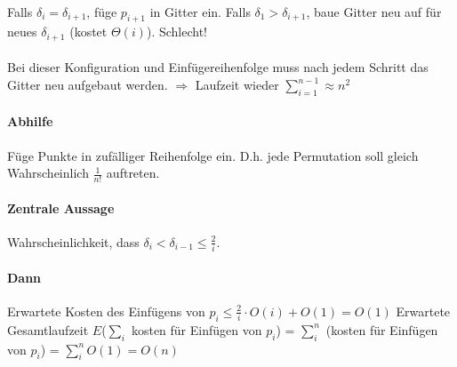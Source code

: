 \paragraph*{} Falls $\delta_i = \delta_{i+1}$, füge $p_{i+1}$ in Gitter ein. Falls $\delta_1 > \delta_{i+1}$, baue Gitter neu auf für neues $\delta_{i+1}$ (kostet $\Theta(i)$). Schlecht!


\paragraph*{} Bei dieser Konfiguration und Einfügereihenfolge muss nach jedem Schritt das Gitter neu aufgebaut werden. $\Rightarrow$ Laufzeit wieder $\sum\limits_{i=1}^{n-1} \approx n^2$

\paragraph*{Abhilfe} Füge Punkte in zufälliger Reihenfolge ein. D.h. jede Permutation soll gleich Wahrscheinlich $\frac{1}{n!}$ auftreten. %

\paragraph*{Zentrale Aussage} Wahrscheinlichkeit, dass $\delta_i < \delta_{i-1} \leq \frac{2}{i}$.

\paragraph*{Dann} Erwartete Kosten des Einfügens von $p_i \leq \frac{2}{i} \cdot O(i) + O(1) = O(1)$
Erwartete Gesamtlaufzeit $E$($\sum\limits_i$ kosten für Einfügen von $p_i$) = $\sum\limits_i^n$ (kosten für Einfügen von $p_i$) = $\sum\limits_i^n O(1) = O(n)$






